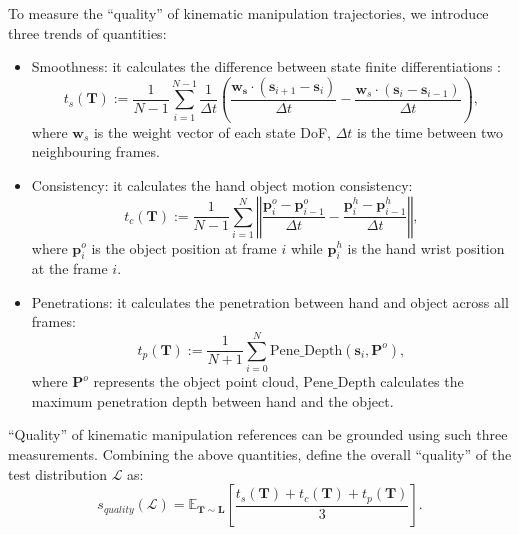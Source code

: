 \begin{itemize}
        \textcolor{myblue}{To measure the ``quality'' of kinematic manipulation trajectories, we introduce three trends of quantities: 
        \begin{itemize}
            \item Smoothness: it calculates the difference between state finite differentiations :	
                    \begin{equation}
                        t_s(\mathbf{T}) := \frac{1}{N-1} \sum_{i=1}^{N-1} \frac{1}{\Delta t}\left( \frac{\mathbf{w_s}\cdot( \mathbf{s}_{i+1} - \mathbf{s}_i)}{\Delta t} - \frac{ \mathbf{w}_s \cdot (\mathbf{s}_i-\mathbf{s}_{i-1})}{\Delta t} \right),
                    \end{equation}
                    where $\mathbf{w}_s$ is the weight vector of each state DoF, $\Delta t$ is the time between two neighbouring frames.
            \item Consistency: it calculates the hand object motion consistency:
                \begin{equation}
                    t_c(\mathbf{T}) := \frac{1}{N-1}\sum_{i=1}^{N} \left\Vert \frac{\mathbf{p}_i^o-\mathbf{p}_{i-1}^o}{\Delta t}-\frac{\mathbf{p}_i^h - \mathbf{p}_{i-1}^h}{\Delta t} \right\Vert,
                \end{equation}
                where $\mathbf{p}_i^o$ is the object position at frame $i$ while $\mathbf{p}_i^h$ is the hand wrist position at the frame $i$. 
            \item Penetrations: it calculates the penetration between hand and object across all frames:
                \begin{equation}
                    t_p(\mathbf{T}) := \frac{1}{N+1} \sum_{i=0}^N \text{{Pene\_Depth}}(\mathbf{s}_i, \mathbf{P}^o),	
                \end{equation}
                where $\mathbf{P}^o$ represents the object point cloud, $\text{Pene\_Depth}$ calculates the maximum penetration depth between hand and the object. 
        \end{itemize}
      ``Quality'' of kinematic manipulation references can be grounded using such three measurements. Combining the above quantities, define the overall ``quality'' of the test distribution $\mathcal{L}$ as:
      \begin{equation}
          s_{quality}(\mathcal{L}) = \mathbb{E}_{\mathbf{T}\sim \mathbf{L}} \left[\frac{t_s(\mathbf{T}) + t_c(\mathbf{T}) + t_p(\mathbf{T})}{3}\right].
      \end{equation}
      }


\end{itemize}
